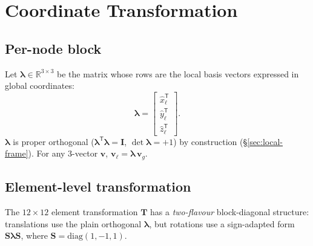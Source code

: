 \documentclass[11pt,a4paper]{article}
\newcommand{\bmath}[1]{\boldsymbol{#1}}
\begin{document}
\section{Coordinate Transformation}\label{sec:transformation}

\subsection{Per-node block}

Let $\bmath{\lambda} \in \mathbb{R}^{3 \times 3}$ be the matrix whose rows are the local basis vectors expressed in global coordinates:
\[
\bmath{\lambda} = \begin{bmatrix} \hat{x}_\ell^\mathsf{T} \\ \hat{y}_\ell^\mathsf{T} \\ \hat{z}_\ell^\mathsf{T} \end{bmatrix}.
\]
$\bmath{\lambda}$ is proper orthogonal ($\bmath{\lambda}^\mathsf{T}\bmath{\lambda} = \bmath{I}$, $\det\bmath{\lambda} = +1$) by construction (\S\ref{sec:local-frame}). For any 3-vector $\bmath{v}$, $\bmath{v}_\ell = \bmath{\lambda}\,\bmath{v}_g$.

\subsection{Element-level transformation}\label{sec:element-transformation}

The $12\times 12$ element transformation $\bmath{T}$ has a \emph{two-flavour} block-diagonal structure: translations use the plain orthogonal $\bmath{\lambda}$, but rotations use a sign-adapted form $\bmath{S}\bmath{\lambda}\bmath{S}$, where $\bmath{S} = \mathrm{diag}(1,-1,1)$.
\end{document}
